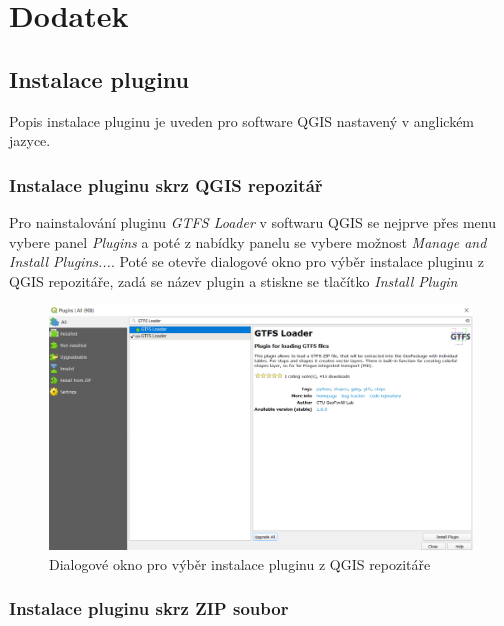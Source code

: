 \chapter*{Dodatek}
\label{dodatek}

\section{Instalace pluginu}

Popis instalace pluginu je uveden pro software QGIS nastavený v anglickém jazyce. 

\subsection{Instalace pluginu skrz QGIS repozitář}

Pro nainstalování pluginu \textit{GTFS Loader} v softwaru QGIS se nejprve přes menu vybere 
panel \textit{Plugins} a poté z nabídky panelu se vybere možnost \textit{Manage and Install Plugins...}.
Poté se otevře dialogové okno pro výběr instalace pluginu z QGIS repozitáře, zadá se název
plugin a stiskne se tlačítko \textit{Install Plugin} 

\begin{figure}[H] \centering
    \includegraphics[width=400pt]{./pictures-dodatek/repositary.png}
    \caption[Dialogové okno pro výběr instalace pluginu z QGIS repozitáře]{Dialogové okno pro výběr instalace pluginu z QGIS repozitáře}
	\label{fig:repositary}              
\end{figure} 

\subsection{Instalace pluginu skrz ZIP soubor}

